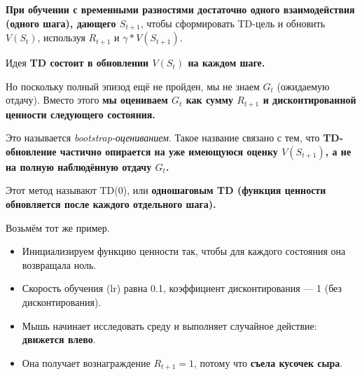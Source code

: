 \documentclass[11pt,a4paper]{article}
\begin{document}
\textbf{При обучении с временными разностями достаточно одного взаимодействия (одного шага), дающего \(S_{t+1}\)}, чтобы сформировать TD-цель и обновить \(V(S_t)\), используя \(R_{t+1}\) и \(\gamma * V(S_{t+1})\).

Идея \textbf{TD состоит в обновлении \(V(S_t)\) на каждом шаге.}

Но поскольку полный эпизод ещё не пройден, мы не знаем \(G_t\) (ожидаемую отдачу). Вместо этого \textbf{мы оцениваем \(G_t\) как сумму \(R_{t+1}\) и дисконтированной ценности следующего состояния.}

Это называется \emph{bootstrap-оцениванием}. Такое название связано с тем, что \textbf{TD-обновление частично опирается на уже имеющуюся оценку \(V(S_{t+1})\), а не на полную наблюдённую отдачу \(G_t\).}


Этот метод называют TD(0), или \textbf{одношаговым TD (функция ценности обновляется после каждого отдельного шага).}


Возьмём тот же пример.


\begin{itemize}
\tightlist
\item
  Инициализируем функцию ценности так, чтобы для каждого состояния она возвращала ноль.
\item
  Скорость обучения (lr) равна 0.1, коэффициент дисконтирования --- 1 (без дисконтирования).
\item
  Мышь начинает исследовать среду и выполняет случайное действие: \textbf{движется влево}.
\item
  Она получает вознаграждение \(R_{t+1}=1\), потому что \textbf{съела кусочек сыра}.
\end{itemize}

\end{document}
